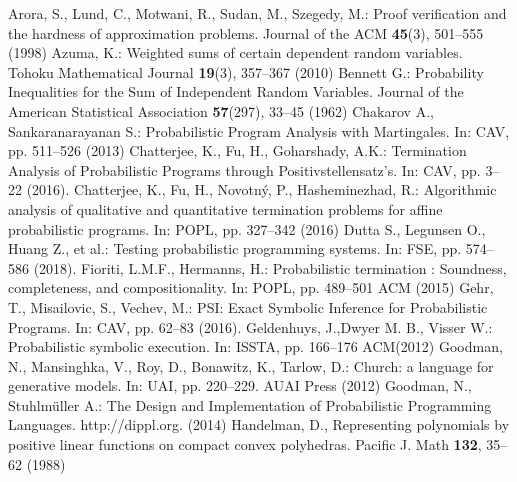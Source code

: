 \documentclass[runningheads]{llncs}
\begin{document}
%
%
%
% 
% 
%
\begin{thebibliography}{8}
Arora, S., Lund, C., Motwani, R., Sudan, M., Szegedy, M.: Proof verification and the hardness of approximation problems. Journal of the ACM \textbf{45}(3), 501--555 (1998)
Azuma, K.: Weighted sums of certain dependent random variables. Tohoku Mathematical Journal \textbf{19}(3), 357--367 (2010)
Bennett G.: Probability Inequalities for the Sum of Independent Random Variables. Journal of the American Statistical Association \textbf{57}(297), 33--45 (1962)
Chakarov A., Sankaranarayanan S.: Probabilistic Program Analysis with Martingales. In: CAV, pp. 511--526  (2013)
Chatterjee, K., Fu, H., Goharshady, A.K.: Termination Analysis of Probabilistic Programs through Positivstellensatz's. In: CAV, pp. 3--22 (2016). 
Chatterjee, K., Fu, H., Novotn\'{y}, P., Hasheminezhad, R.: Algorithmic analysis of
qualitative and quantitative termination problems for affine probabilistic programs. In: POPL, pp. 327--342 (2016)
Dutta S., Legunsen O., Huang Z., et al.: Testing probabilistic programming systems. In: FSE, pp. 574--586 (2018). 
Fioriti, L.M.F., Hermanns, H.: Probabilistic termination : Soundness, completeness, and compositionality. In: POPL, pp. 489--501 ACM (2015)
Gehr, T., Misailovic, S., Vechev, M.: {PSI:} Exact Symbolic Inference for Probabilistic Programs. In: CAV, pp. 62--83 (2016). 
Geldenhuys, J.,Dwyer M. B., Visser W.: Probabilistic symbolic execution. In: ISSTA, pp. 166--176 ACM(2012)
Goodman, N., Mansinghka, V., Roy, D., Bonawitz, K., Tarlow, D.: Church: a language for generative models. In: UAI, pp. 220--229. AUAI Press (2012)
Goodman, N., Stuhlmüller A.: The Design and Implementation of Probabilistic Programming Languages. http://dippl.org.  (2014)
Handelman, D., Representing polynomials by positive linear functions on compact convex polyhedras. Pacific J. Math \textbf{132}, 35--62 (1988)

\end{thebibliography}
\end{document}
